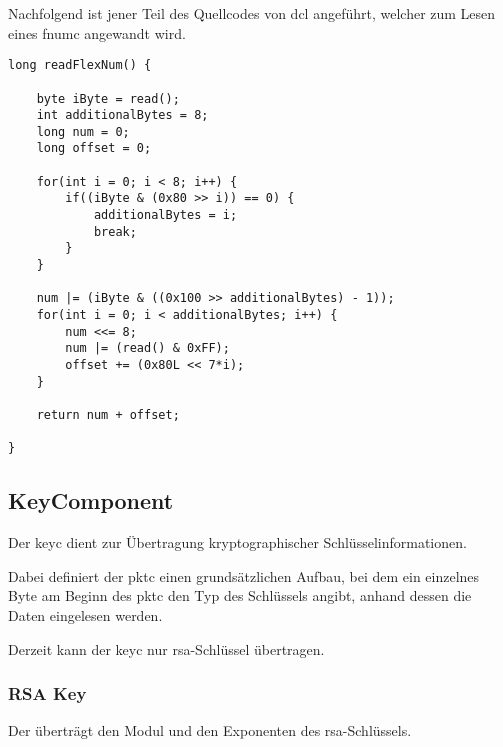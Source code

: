 Nachfolgend ist jener Teil des Quellcodes von \gls{dcl} angeführt, welcher zum Lesen eines
\gls{fnumc} angewandt wird.\\

\javalisting
\listingneedspace
\begin{lstlisting}[caption={Lesen eines \gls*{fnumc} (Java)},captionpos=b]
long readFlexNum() {

	byte iByte = read();
	int additionalBytes = 8;
	long num = 0;
	long offset = 0;

	for(int i = 0; i < 8; i++) {
		if((iByte & (0x80 >> i)) == 0) {
			additionalBytes = i;
			break;
		}
	}

	num |= (iByte & ((0x100 >> additionalBytes) - 1));
	for(int i = 0; i < additionalBytes; i++) {
		num <<= 8;
		num |= (read() & 0xFF);
		offset += (0x80L << 7*i);
	}

	return num + offset;

}
\end{lstlisting}


\subsection*{KeyComponent}
\label{dcl-packetcomponents-key}

Der \gls{keyc} dient zur Übertragung kryptographischer Schlüsselinformationen.

Dabei definiert der \gls{pktc} einen grundsätzlichen Aufbau, bei dem ein
einzelnes Byte am Beginn des \gls{pktc} den Typ des Schlüssels angibt, anhand
dessen die Daten eingelesen werden.

\keycbytefield

Derzeit kann der \gls{keyc} nur \gls{rsa}-Schlüssel übertragen.

\subsubsection{RSA Key}
\label{dcl-keyc-rsa}
Der \comp{\keycrsa} überträgt den Modul und den Exponenten des
\gls{rsa}-Schlüssels.

\keycrsabytefield
